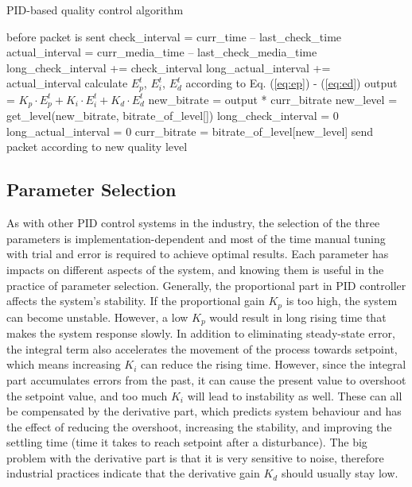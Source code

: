 \documentclass[journal]{IEEEtran}
\begin{document}
\begin{algorithm}
\caption{PID-based quality control algorithm}
\label{algo:control}
\begin{algorithmic}
    \STATE before packet is sent
    \STATE check\_interval = curr\_time -- last\_check\_time
    \STATE actual\_interval = curr\_media\_time -- last\_check\_media\_time
    \STATE long\_check\_interval += check\_interval
    \STATE long\_actual\_interval += actual\_interval
    \STATE calculate $E_p^t$, $E_i^t$, $E_d^t$ according to Eq. (\ref{eq:ep}) - (\ref{eq:ed})
    \STATE output = ${K_p} \cdot E_p^t + {K_i} \cdot E_i^t + {K_d} \cdot E_d^t$
    \STATE new\_bitrate = output * curr\_bitrate
    \STATE new\_level = get\_level(new\_bitrate, bitrate\_of\_level[])
    	\STATE long\_check\_interval = 0
    	\STATE long\_actual\_interval = 0
    	\STATE curr\_bitrate = bitrate\_of\_level[new\_level]
    \ENDIF
    \STATE send packet according to new quality level
\end{algorithmic}
\end{algorithm}


\subsection{Parameter Selection}
\label{subsec:parameter-selection}

As with other PID control systems in the industry, the selection of the three parameters is implementation-dependent and most of the time manual tuning with trial and error is required to achieve optimal results. Each parameter has impacts on different aspects of the system, and knowing them is useful in the practice of parameter selection. Generally,  the proportional part in PID controller affects the system's stability. If the proportional gain $K_p$ is too high, the system can become unstable. However, a low $K_p$ would result in long rising time that makes the system response slowly. In addition to eliminating steady-state error, the integral term also accelerates the movement of the process towards setpoint, which means increasing $K_i$ can reduce the rising time. However, since the integral part accumulates errors from the past, it can cause the present value to overshoot the setpoint value, and too much $K_i$ will lead to instability as well. These can all be compensated by the derivative part, which predicts system behaviour and has the effect of reducing the overshoot, increasing the stability, and improving the settling time (time it takes to reach setpoint after a disturbance). The big problem with the derivative part is that it is very sensitive to noise, therefore industrial practices indicate that the derivative gain $K_d$ should usually stay low.
\end{document}
